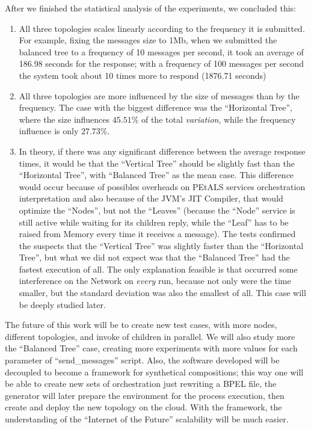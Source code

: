 
After we finished the statistical analysis of the experiments, we concluded this:
\begin{enumerate}
	\item All three topologies scales linearly according to the frequency it is submitted. For example, fixing the messages size to 1Mb, when we submitted the balanced tree to a frequency of 10 messages per second, it took an average of 186.98 seconds for the response; with a frequency of 100 messages per second the system took about 10 times more to respond (1876.71 seconds)
	\item All three topologies are more influenced by the size of messages than by the frequency. The case with the biggest difference was the ``Horizontal Tree'', where the size influences $45.51\%$ of the total \emph{variation}, while the frequency influence is only $27.73\%$.
	\item In theory, if there was any significant difference between the average response times, it would be that the ``Vertical Tree'' should be slightly fast than the ``Horizontal Tree'', with ``Balanced Tree'' as the mean case. This difference would occur because of possibles overheads on PEtALS services orchestration interpretation and also because of the JVM's JIT Compiler, that would optimize the ``Nodes'', but not the ``Leaves'' (because the ``Node'' service is still active while waiting for its children reply, while the ``Leaf'' has to be raised from Memory every time it receives a message). The tests confirmed the suspects that the ``Vertical Tree'' was slightly faster than the ``Horizontal Tree'', but what we did not expect was that the ``Balanced Tree'' had the fastest execution of all. The only explanation feasible is that occurred some interference on the Network on \emph{every} run, because not only were the time smaller, but the standard deviation was also the smallest of all. This case will be deeply studied later.
\end{enumerate}


The future of this work will be to create new test cases, with more nodes, different topologies, and invoke of children in parallel. We will also study more the ``Balanced Tree'' case, creating more experiments with more values for each parameter of ``send_messages'' script. Also, the software developed will be decoupled to become a framework for synthetical compositions; this way one will be able to create new sets of orchestration just rewriting a BPEL file, the generator will later prepare the environment for the process execution, then create and deploy the new topology on the cloud. With the framework, the understanding of the ``Internet of the Future'' scalability will be much easier.